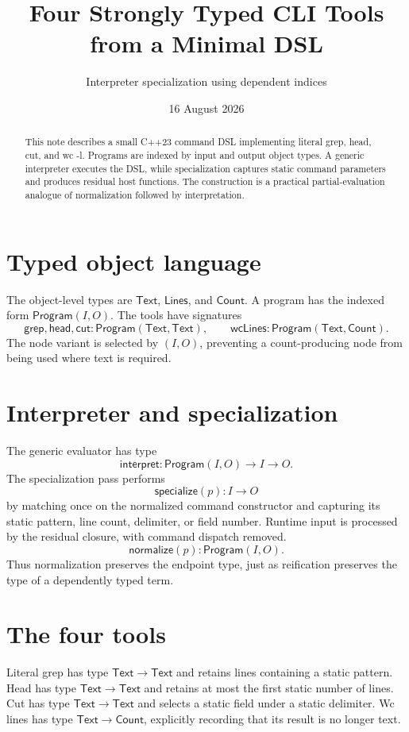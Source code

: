 \documentclass[11pt,a4paper]{article}
\title{Four Strongly Typed CLI Tools from a Minimal DSL}
\author{Interpreter specialization using dependent indices}
\date{16 August 2026}
\begin{document}
\maketitle
\begin{abstract}
This note describes a small C++23 command DSL implementing literal grep, head, cut, and wc -l. Programs are indexed by input and output object types. A generic interpreter executes the DSL, while specialization captures static command parameters and produces residual host functions. The construction is a practical partial-evaluation analogue of normalization followed by interpretation.
\end{abstract}
\section{Typed object language}
The object-level types are $\mathsf{Text}$, $\mathsf{Lines}$, and $\mathsf{Count}$. A program has the indexed form $\mathsf{Program}(I,O)$. The tools have signatures
\[
\mathsf{grep},\mathsf{head},\mathsf{cut}:\mathsf{Program}(\mathsf{Text},\mathsf{Text}),\qquad
\mathsf{wcLines}:\mathsf{Program}(\mathsf{Text},\mathsf{Count}).
\]
The node variant is selected by $(I,O)$, preventing a count-producing node from being used where text is required.
\section{Interpreter and specialization}
The generic evaluator has type
\[
\mathsf{interpret}:\mathsf{Program}(I,O)\to I\to O.
\]
The specialization pass performs
\[
\mathsf{specialize}(p):I\to O
\]
by matching once on the normalized command constructor and capturing its static pattern, line count, delimiter, or field number. Runtime input is processed by the residual closure, with command dispatch removed.
\[
\mathsf{normalize}(p):\mathsf{Program}(I,O).
\]
Thus normalization preserves the endpoint type, just as reification preserves the type of a dependently typed term.
\section{The four tools}
Literal grep has type $\mathsf{Text}\to\mathsf{Text}$ and retains lines containing a static pattern. Head has type $\mathsf{Text}\to\mathsf{Text}$ and retains at most the first static number of lines. Cut has type $\mathsf{Text}\to\mathsf{Text}$ and selects a static field under a static delimiter. Wc lines has type $\mathsf{Text}\to\mathsf{Count}$, explicitly recording that its result is no longer text.
\end{document}
